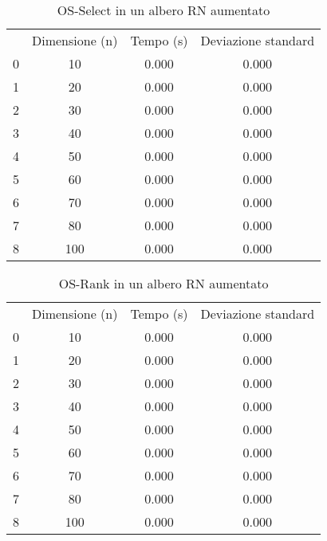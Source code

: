 \begin{table}[H]
\centering
\caption{OS-Select in un albero RN aumentato}
\label{OS-Select in un albero RN aumentato}
\begin{tabular}{cccc}
 & Dimensione (n) & Tempo (s) & Deviazione standard \\
0 & 10 & 0.000 & 0.000 \\
\cline{1-4}
1 & 20 & 0.000 & 0.000 \\
\cline{1-4}
2 & 30 & 0.000 & 0.000 \\
\cline{1-4}
3 & 40 & 0.000 & 0.000 \\
\cline{1-4}
4 & 50 & 0.000 & 0.000 \\
\cline{1-4}
5 & 60 & 0.000 & 0.000 \\
\cline{1-4}
6 & 70 & 0.000 & 0.000 \\
\cline{1-4}
7 & 80 & 0.000 & 0.000 \\
\cline{1-4}
8 & 100 & 0.000 & 0.000 \\
\cline{1-4}
\end{tabular}
\end{table}

\begin{table}[H]
\centering
\caption{OS-Rank in un albero RN aumentato}
\label{OS-Rank in un albero RN aumentato}
\begin{tabular}{cccc}
 & Dimensione (n) & Tempo (s) & Deviazione standard \\
0 & 10 & 0.000 & 0.000 \\
\cline{1-4}
1 & 20 & 0.000 & 0.000 \\
\cline{1-4}
2 & 30 & 0.000 & 0.000 \\
\cline{1-4}
3 & 40 & 0.000 & 0.000 \\
\cline{1-4}
4 & 50 & 0.000 & 0.000 \\
\cline{1-4}
5 & 60 & 0.000 & 0.000 \\
\cline{1-4}
6 & 70 & 0.000 & 0.000 \\
\cline{1-4}
7 & 80 & 0.000 & 0.000 \\
\cline{1-4}
8 & 100 & 0.000 & 0.000 \\
\cline{1-4}
\end{tabular}
\end{table}
